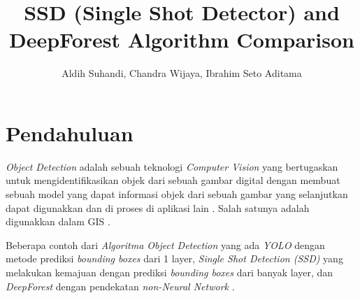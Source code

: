 \documentclass[a4paper]{article}
\begin{document}
\linespread{1.5}

\title{SSD (Single Shot Detector) and DeepForest Algorithm Comparison}
\author{Aldih Suhandi, Chandra Wijaya, Ibrahim Seto Aditama}

\maketitle

\newpage

\tableofcontents
\newpage

\section*{Pendahuluan}

\textit{Object Detection} adalah sebuah teknologi \textit{Computer Vision} yang bertugaskan untuk mengidentifikasikan objek dari sebuah gambar digital dengan membuat sebuah model yang dapat informasi objek dari sebuah gambar yang selanjutkan dapat digunakkan dan di proses di aplikasi lain \autocite{zou2019object}. Salah satunya adalah digunakkan dalam GIS \autocite{arcgis-pro-ssd}. 

Beberapa contoh dari \textit{Algoritma Object Detection} yang ada \textit{YOLO} dengan metode prediksi \textit{bounding boxes} dari 1 layer, \textit{Single Shot Detection (SSD)} yang melakukan kemajuan dengan prediksi \textit{bounding boxes} dari banyak layer, dan \textit{DeepForest} dengan pendekatan \textit{non-Neural Network} \autocite{8569683, zhou2019deep}. 


\newpage
\end{document}
